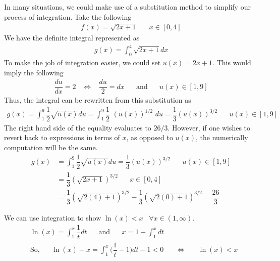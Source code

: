 \begin{example}
In many situations, we could make use of a substitution method to simplify our process of integration. Take the following
\begin{align*}
    f(x) = \sqrt{2x + 1} \hspace{20pt} x \in [0, 4]
\end{align*}
We have the definite integral represented as 
\begin{align*}
    g(x) = \int_{0}^{4} \sqrt{2x + 1} dx
\end{align*}
To make the job of integration easier, we could set $u(x) = 2x + 1$. This would imply the following
\begin{align*}
    \dfrac{du}{dx} = 2 \hspace{10pt} \Longleftrightarrow \hspace{10pt} \dfrac{du}{2} = dx \hspace{20pt} \text{and} \hspace{20pt} u(x) \in [1, 9]
\end{align*}
Thus, the integral can be rewritten from this substitution as
\begin{align*}
    g(x) = \int_{1}^{9} \dfrac{1}{2}\sqrt{u(x)} du = \int_{1}^{9} \dfrac{1}{2} \hspace{4pt} (u(x))^{1/2} \hspace{4pt} du = \dfrac{1}{3} (u(x))^{3/2} \hspace{20pt} u(x) \in [1, 9]
\end{align*}
The right hand side of the equality evaluates to $26/3$. However, if one wishes to revert back to expressions in terms of $x$, as opposed to $u(x)$, the numerically computation will be the same.
\begin{align*}
    g(x) &= \int_{1}^{9} \dfrac{1}{2}\sqrt{u(x)} du = \dfrac{1}{3} (u(x))^{3/2} \hspace{20pt} u(x) \in [1, 9]\\[2ex]
    &= \dfrac{1}{3} (\sqrt{2x + 1})^{3/2} \hspace{20pt} x \in [0, 4]\\[2ex]
    &= \dfrac{1}{3} (\sqrt{2(4) + 1})^{3/2} - \dfrac{1}{3} (\sqrt{2(0) + 1})^{3/2} = \dfrac{26}{3}
\end{align*}
\end{example}

\begin{example}
    We can use integration to show $\ln(x) < x \hspace{10pt} \forall x \in (1, \infty)$.
    \begin{align*}
        &\ln(x) = \int_{1}^{x} \dfrac{1}{t} dt \hspace{20pt} \text{and} \hspace{20pt} x = 1 + \int_{1}^{x} dt\\
        &\text{So,} \hspace{20pt} \ln(x) - x = \int_{1}^{x} \Big(\dfrac{1}{t} - 1\Big) dt - 1 < 0 \hspace{20pt} \Longleftrightarrow \hspace{20pt} \ln(x) < x
    \end{align*}
\end{example}

